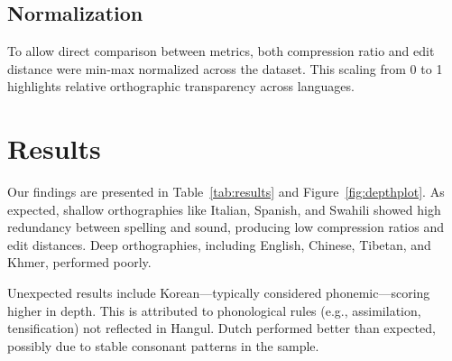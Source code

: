 \documentclass[12pt]{article}
\begin{document}
\subsection{Normalization}
To allow direct comparison between metrics, both compression ratio and edit distance were min-max normalized across the dataset. This scaling from 0 to 1 highlights relative orthographic transparency across languages.

\section{Results}
Our findings are presented in Table~\ref{tab:results} and Figure~\ref{fig:depthplot}. As expected, shallow orthographies like Italian, Spanish, and Swahili showed high redundancy between spelling and sound, producing low compression ratios and edit distances. Deep orthographies, including English, Chinese, Tibetan, and Khmer, performed poorly.

Unexpected results include Korean—typically considered phonemic—scoring higher in depth. This is attributed to phonological rules (e.g., assimilation, tensification) not reflected in Hangul. Dutch performed better than expected, possibly due to stable consonant patterns in the sample.
\end{document}
